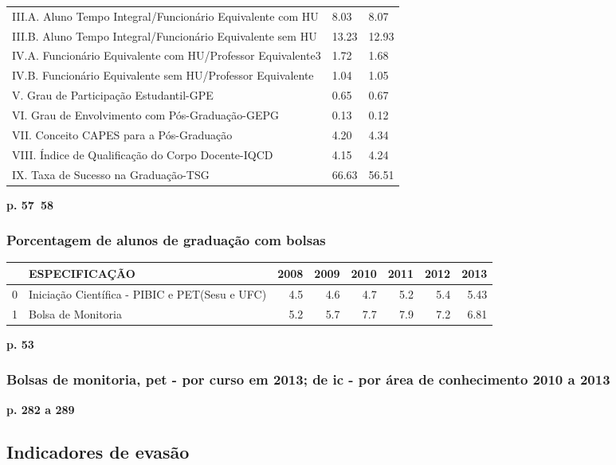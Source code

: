 \documentclass{article}
\begin{document}
\begin{tabular}{lll}
III.A. Aluno Tempo Integral/Funcionário Equivalente com HU  &  8.03 &  8.07 \\
III.B. Aluno Tempo Integral/Funcionário Equivalente sem HU  &  13.23 &  12.93 \\
IV.A. Funcionário Equivalente com HU/Professor Equivalente3 &  1.72 &  1.68 \\
IV.B. Funcionário Equivalente sem HU/Professor Equivalente  &  1.04 &  1.05 \\
V. Grau de Participação Estudantil-GPE                      &  0.65 &  0.67 \\
VI. Grau de Envolvimento com Pós-Graduação-GEPG             &  0.13 &  0.12 \\
VII. Conceito CAPES para a Pós-Graduação                    &  4.20 &  4.34 \\
VIII. Índice de Qualificação do Corpo Docente-IQCD          &  4.15 &  4.24 \\
IX. Taxa de Sucesso na Graduação-TSG                        &  66.63 &  56.51 \\
\bottomrule
\end{tabular}
\textbf{p. 57~58}

\subsubsection{Porcentagem de alunos de graduação com bolsas}
\begin{tabular}{llrrrrrr}
\toprule
{} &                                   ESPECIFICAÇÃO &  2008 &  2009 &  2010 &  2011 &  2012 &  2013 \\
\midrule
0 &  Iniciação Científica - PIBIC e PET(Sesu e UFC) &   4.5 &   4.6 &   4.7 &   5.2 &   5.4 &  5.43 \\
1 &                              Bolsa de Monitoria &   5.2 &   5.7 &   7.7 &   7.9 &   7.2 &  6.81 \\
\bottomrule
\end{tabular}

\textbf{p. 53}

\subsubsection{Bolsas de monitoria, pet - por curso em 2013; de ic - por área de conhecimento 2010 a 2013}
\textbf{p. 282 a 289}

\subsection{Indicadores de evasão}
\cite{esclarecimentos_calculos}
\cite{mudanca_calculos}
\end{document}

